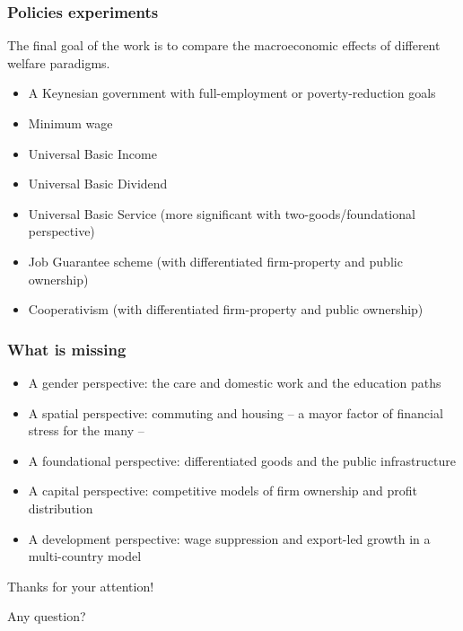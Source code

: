 \documentclass[]{beamer}
\begin{document}
\begin{frame}
	\frametitle{Policies experiments}
	The final goal of the work is to compare the macroeconomic effects of different welfare paradigms.
	\begin{itemize}
		\item A Keynesian government with full-employment or poverty-reduction goals
		\item Minimum wage
		\item Universal Basic Income
		\item Universal Basic Dividend
		\item Universal Basic Service (more significant with two-goods/foundational perspective)
		\item Job Guarantee scheme (with differentiated firm-property and public ownership)
		\item Cooperativism (with differentiated firm-property and public ownership)
	\end{itemize}
\end{frame}

\begin{frame}
	\frametitle{What is missing}
	\begin{itemize}
		\item A gender perspective: the care and domestic work and the education paths
		\item A spatial perspective: commuting and housing -- a mayor factor of financial stress for the many --
		\item A foundational perspective: differentiated goods and the public infrastructure
		\item A capital perspective: competitive models of firm ownership and profit distribution
		\item A development perspective: wage suppression and export-led growth in a multi-country model
	\end{itemize}
\end{frame}

\begin{frame}
	\centering
	Thanks for your attention!

	Any question?
\end{frame}
\end{document}
